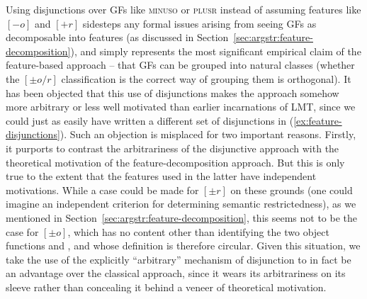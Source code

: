 \documentclass[output=paper]{langscibook}
\begin{document}
Using disjunctions over GFs like \textsc{minuso} or \textsc{plusr} instead of
assuming features like $[-o]$ and $[+r]$ sidesteps any formal issues arising
from seeing GFs as decomposable into features (as discussed in
Section~\ref{sec:argstr:feature-decomposition}), and simply represents the most
significant empirical claim of the feature-based approach -- that GFs can be
grouped into natural classes (whether the $[\pm o/r]$ classification is the
correct way of grouping them is orthogonal). It has been objected that this use
of disjunctions makes the approach somehow more arbitrary or less well motivated
than earlier incarnations of LMT, since we could just as easily have written a
different set of disjunctions in (\ref{ex:feature-disjunctions}). Such an
objection is misplaced for two important reasons. Firstly, it purports to
contrast the arbitrariness of the disjunctive approach with the theoretical
motivation of the feature-decomposition approach. But this is only true to the
extent that the features used in the latter have independent motivations. While
a case could be made for $[\pm r]$ on these grounds (one could imagine an
independent criterion for determining semantic restrictedness), as we mentioned
in Section~\ref{sec:argstr:feature-decomposition}, this seems not to be the case for
$[\pm o]$, which has no content other than identifying the two object functions
\OBJ and \OBJTHETA, and whose definition is therefore circular. Given this
situation, we take the use of the explicitly ``arbitrary'' mechanism of
disjunction to in fact be an advantage over the classical approach, since it
wears its arbitrariness on its sleeve rather than concealing it behind a veneer
of theoretical motivation.
\end{document}
